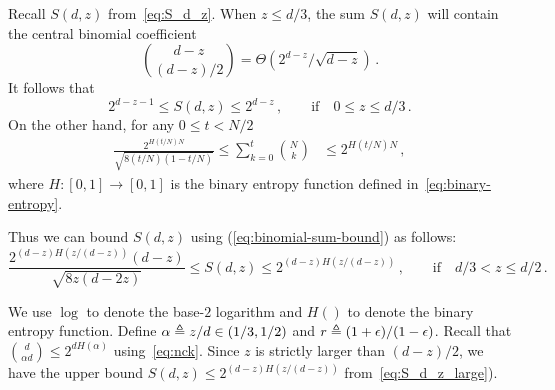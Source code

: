 




Recall $S(d,z)$ from~\eqref{eq:S_d_z}. 
When $z \leq d/3$, the sum $S(d,z)$
will contain the central binomial coefficient $${d-z \choose (d-z)/2} = \Theta(2^{d-z}/\sqrt{d-z})\,.$$ 
It follows that 
\begin{equation} \label{eq:S_d_z_small}
    2^{d-z-1} 
    \leq 
    S(d,z)
    \leq 2^{d-z}\,, 
    \qquad \text{if}\quad 0 \leq z \leq d/3 
    \,.
\end{equation}
On the other hand, for any $0 \leq t < N/2$
\begin{align}\label{eq:binomial-sum-bound}
\frac{2^{H(t/N)N} }{\sqrt{8 (t/N) (1-t/N)} }
\leq 
\sum_{k=0}^t{ {N \choose k} } 
&\leq 
2^{H(t/N)N} \, , 
\end{align}
where $H : [0, 1] \rightarrow [0, 1]$ is the binary entropy function defined 
in~\eqref{eq:binary-entropy}.

Thus we can bound $S(d,z)$ using (\ref{eq:binomial-sum-bound}) as follows:
\begin{equation} \label{eq:S_d_z_large}
    \frac{2^{(d-z)H(z/(d-z))}(d-z)}{\sqrt{8 z(d-2z) }}
    \leq
    S(d, z) 
    \leq
    2^{(d-z)H(z/(d-z))}
    \,,\qquad \text{if} \quad d/3 < z \leq d/2 
    \,.
\end{equation}



  We use $\log$ to denote the base-$2$ logarithm and $H()$ to denote the binary entropy function. 
  Define $\alpha \triangleq z/d \in (1/3, 1/2)$ and $r \triangleq (1+\epsilon)/(1-\epsilon)$.
  Recall that $\binom{d}{\alpha d} \leq 2^{d H(\alpha)}$ using~\eqref{eq:nck}.
  Since $z$ is strictly larger than $(d - z)/2$, 
  we have the upper bound $S(d,z) \leq 2^{(d-z)H(z/(d-z))}$ from~\eqref{eq:S_d_z_large}). %


